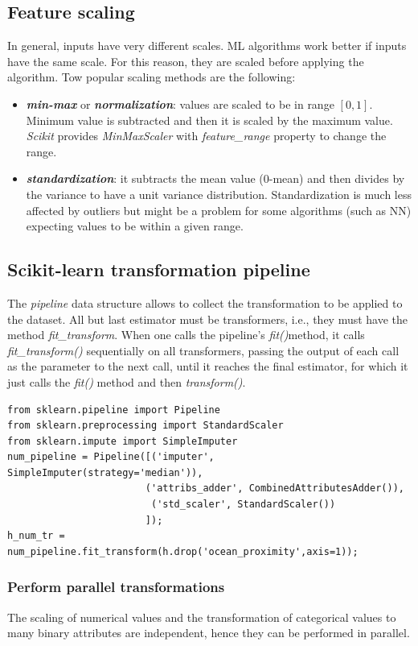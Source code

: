 \documentclass[12pt, letterpaper]{article}
\theoremstyle{definition}
\let\ti\textit
\let\tb\textbf
\begin{document}
\subsection{Feature scaling}
In general, inputs have very different scales. ML algorithms work better if inputs have the same scale. For this reason, they are scaled before applying the algorithm. Tow popular scaling methods are the following:
\begin{itemize}
\item \ti{\tb{min-max}} or \ti{\tb{normalization}}: values are scaled to be in range $[0,1]$. Minimum value is subtracted and then it is scaled by the maximum value. \ti{Scikit} provides \ti{MinMaxScaler} with \ti{feature\_range} property to change the range.
\item \ti{\tb{standardization}}: it subtracts the mean value (0-mean) and then divides by the variance to have a unit variance distribution. Standardization is much less affected by outliers but might be a problem for some algorithms (such as NN) expecting values to be within a given range.
\end{itemize}

\subsection{Scikit-learn transformation pipeline}
The \ti{pipeline} data structure allows to collect the transformation to be applied to the dataset. All but last estimator must be transformers, i.e., they must have the method \ti{fit\_transform}. When one calls the pipeline's \ti{fit()}method, it calls \ti{fit\_transform()} sequentially on all transformers, passing the output of each call as the parameter to the next call, until it reaches the final estimator, for which it just calls the \ti{fit()} method and then \ti{transform()}.
\begin{lstlisting}
from sklearn.pipeline import Pipeline
from sklearn.preprocessing import StandardScaler
from sklearn.impute import SimpleImputer
num_pipeline = Pipeline([('imputer', SimpleImputer(strategy='median')),
                        ('attribs_adder', CombinedAttributesAdder()),
                         ('std_scaler', StandardScaler())
                        ]);
h_num_tr = num_pipeline.fit_transform(h.drop('ocean_proximity',axis=1));
\end{lstlisting}
\subsubsection{Perform parallel transformations}
The scaling of numerical values and the transformation of categorical values to many binary attributes are independent, hence they can be performed in parallel.
\end{document}
